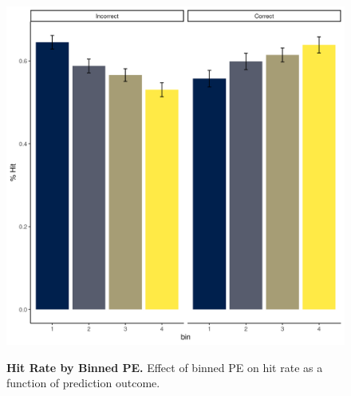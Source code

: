 \documentclass[a4paper,12pt]{article}
\begin{document}
\begin{figure}[ht!]
{\includegraphics[width=1\textwidth]{figures/binnedPE_mem.png}}
\caption{\textbf{Hit Rate by Binned PE.} Effect of binned PE on hit rate as a function of prediction outcome. }
\label{fig:PEbin_mem}

\end{figure}
\end{document}
